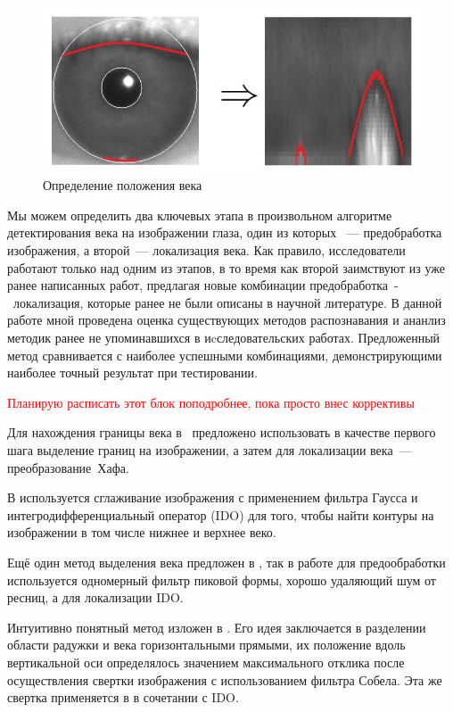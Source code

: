 \documentclass[12pt]{article} %
\begin{document}
\begin{figure}[h]
	
	\centering
	
	\includegraphics[width=0.8\linewidth]{glaz3.jpg}
	
	\caption{Определение положения века}
	
	\label{fig:glaz3}
	
\end{figure}

Мы можем определить два ключевых этапа в произвольном алгоритме детектирования века на изображении глаза, один из которых ~--- предобработка изображения, а второй~--- локализация века. Как правило, исследователи работают только над одним из этапов, в то время как второй заимствуют из уже ранее написанных работ, предлагая новые комбинации предобработка~-~локализация, которые ранее не были описаны в научной литературе. В данной работе мной проведена оценка существующих методов распознавания и ананлиз методик ранее не упоминавшихся в иcследовательских работах. Предложенный метод сравнивается с наиболее успешными комбинациями, демонстрирующими наиболее точный результат при тестировании.

\textcolor{red}{Планирую расписать этот блок поподробнее, пока просто внес коррективы}

Для нахождения границы века в~\cite{Wildes} предложено использовать в качестве первого шага выделение границ на изображении, а затем для локализации века~--- преобразование~Хафа. 

В \cite{Daugman} используется сглаживание изображения с применением фильтра Гаусса и интегродифференциальный оператор
(IDO) для того, чтобы найти контуры на изображении в том числе нижнее и верхнее веко.

Ещё один метод выделения века предложен в \cite{KKX}, так в работе для предообработки используется одномерный фильтр пиковой формы, хорошо удаляющий шум от ресниц, а для локализации IDO.

Интуитивно понятный метод изложен в \cite{Masek}. Его идея заключается в разделении области радужки и века горизонтальными прямыми, их положение вдоль вертикальной оси определялось значением максимального отклика после осуществления свертки изображения с использованием фильтра Собела. Эта же свертка применяется в \cite{KP} в сочетании с IDO. 
\end{document}
